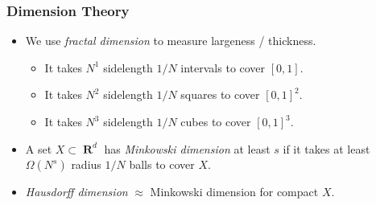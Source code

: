 \documentclass[usenames,dvipsnames,handout]{beamer}
\DeclareMathOperator{\RR}{\textbf{R}}
\begin{document}
\begin{frame}
  \frametitle{Dimension Theory}

\begin{itemize}
    \item<1-> We use \emph{fractal dimension} to measure largeness / thickness.

    \begin{itemize}
        \item<2-> It takes $N^1$ sidelength $1/N$ intervals to cover $[0,1]$.
        \item<2-> It takes $N^2$ sidelength $1/N$ squares to cover $[0,1]^2$.
        \item<2-> It takes $N^3$ sidelength $1/N$ cubes to cover $[0,1]^3$.
    \end{itemize}

    \item<3-> A set $X \subset \RR^d$ has \emph{Minkowski dimension} at least $s$ if it takes at least $\Omega(N^s)$ radius $1/N$ balls to cover $X$.

    \item<4-> \emph{Hausdorff dimension} $\approx$ Minkowski dimension for compact $X$. 
\end{itemize}


\end{frame}
\end{document}
